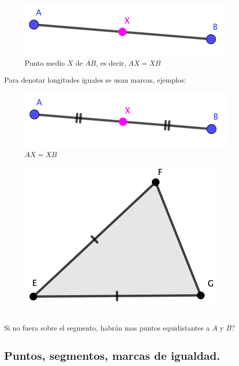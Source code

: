 \begin{figure}[H]
	\centering
	\includegraphics[width=0.5\linewidth]{Geometria/imgs/punto_medio}
	\caption{Punto medio  $X$ de $\overline{AB}$, es decir, $AX=XB$}
	\label{punto_medio}
\end{figure}

Para denotar longitudes iguales se usan marcas, ejemplos:

\begin{figure}[H]
	\centering
	\includegraphics[width=0.5\linewidth]{Geometria/imgs/notacion_longitud_igual}
	\caption{$AX=XB$}
	\label{notacion_longitud_igual}
\end{figure}

\begin{figure}[H]
	\centering
	\includegraphics[width=0.5\linewidth]{Geometria/imgs/notacion_en_un_triangulo}
	\label{notacion_en_un_triangulo}
\end{figure}


\begin{exer}{\ \\}
		Si no fuera sobre el segmento, habrán mas puntos equidistantes a $A$ y $B$?
\end{exer}

\newpage
\begin{center}
		\vspace{-1cm}
		\subsection{ Puntos, segmentos, marcas de igualdad.}\label{ejercicios_puntos_segmentos_etc} 
\end{center}
			
